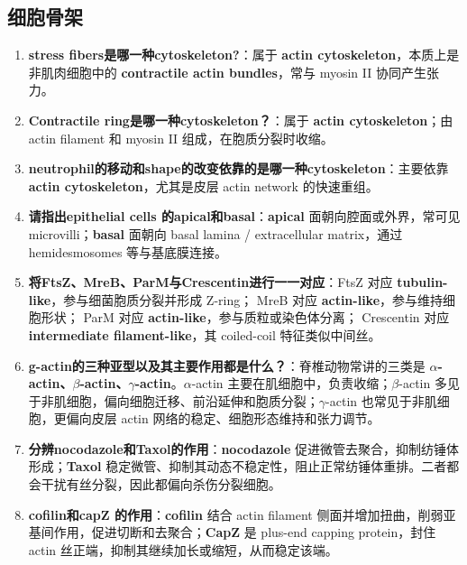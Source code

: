 \documentclass[12pt,fontset=none]{ctexart}
\begin{document}
\subsection*{细胞骨架}
\begin{enumerate}
\item \textbf{stress fibers是哪一种cytoskeleton?}：属于 \textbf{actin cytoskeleton}，本质上是非肌肉细胞中的 \textbf{contractile actin bundles}，常与 myosin II 协同产生张力。

\item \textbf{Contractile ring是哪一种cytoskeleton？}：属于 \textbf{actin cytoskeleton}；由 actin filament 和 myosin II 组成，在胞质分裂时收缩。

\item \textbf{neutrophil的移动和shape的改变依靠的是哪一种cytoskeleton}：主要依靠 \textbf{actin cytoskeleton}，尤其是皮层 actin network 的快速重组。

\item \textbf{请指出epithelial cells 的apical和basal}：\textbf{apical} 面朝向腔面或外界，常可见 microvilli；\textbf{basal} 面朝向 basal lamina / extracellular matrix，通过 hemidesmosomes 等与基底膜连接。

\item \textbf{将FtsZ、MreB、ParM与Crescentin进行一一对应}：FtsZ 对应 \textbf{tubulin-like}，参与细菌胞质分裂并形成 Z-ring；
MreB 对应 \textbf{actin-like}，参与维持细胞形状；
ParM 对应 \textbf{actin-like}，参与质粒或染色体分离；
Crescentin 对应 \textbf{intermediate filament-like}，其 coiled-coil 特征类似中间丝。

\item \textbf{g-actin的三种亚型以及其主要作用都是什么？}：脊椎动物常讲的三类是 \textbf{$\alpha$-actin、$\beta$-actin、$\gamma$-actin}。$\alpha$-actin 主要在肌细胞中，负责收缩；$\beta$-actin 多见于非肌细胞，偏向细胞迁移、前沿延伸和胞质分裂；$\gamma$-actin 也常见于非肌细胞，更偏向皮层 actin 网络的稳定、细胞形态维持和张力调节。

\item \textbf{分辨nocodazole和Taxol的作用}：\textbf{nocodazole} 促进微管去聚合，抑制纺锤体形成；\textbf{Taxol} 稳定微管、抑制其动态不稳定性，阻止正常纺锤体重排。二者都会干扰有丝分裂，因此都偏向杀伤分裂细胞。

\item \textbf{cofilin和capZ 的作用}：\textbf{cofilin} 结合 actin filament 侧面并增加扭曲，削弱亚基间作用，促进切断和去聚合；\textbf{CapZ} 是 plus-end capping protein，封住 actin 丝正端，抑制其继续加长或缩短，从而稳定该端。


\end{enumerate}
\end{document}
